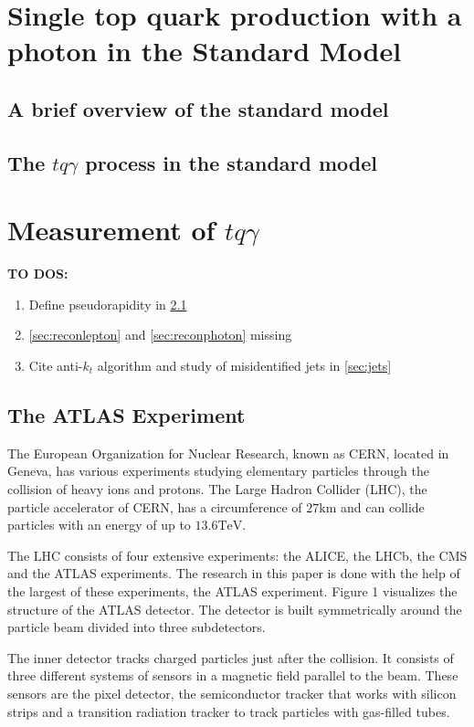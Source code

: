 \chapter{Single top quark production with a photon in the Standard Model}
\section{A brief overview of the standard model}
\section{The \texorpdfstring{$tq\gamma$}{tqGamma} process in the standard model}


\chapter{Measurement of \texorpdfstring{$tq\gamma$}{tqGamma}}
\textbf{TO DOS:}
\begin{enumerate}
    \item Define pseudorapidity in \ref{sec:atlas}
    \item \ref{sec:reconlepton} and \ref{sec:reconphoton} missing
    \item Cite anti-$k_t$ algorithm and study of misidentified jets in \ref{sec:jets}
\end{enumerate}


\section{The ATLAS Experiment}
\label{sec:atlas}
The European Organization for Nuclear Research, known as CERN, located in Geneva, has various experiments studying elementary particles through the collision of heavy ions and protons. 
The Large Hadron Collider (LHC), the particle accelerator of CERN, has a circumference of $27 \si{\kilo\metre}$ and can collide particles with an energy of up to $13.6 \si{\tera\electronvolt}$. 


The LHC consists of four extensive experiments: the ALICE, the LHCb, the CMS and the ATLAS experiments. The research in this paper is done with the help of the largest of these experiments, the ATLAS experiment. Figure 1 visualizes the structure of the ATLAS detector.  The detector is built symmetrically around the particle beam divided into three subdetectors.

The inner detector tracks charged particles just after the collision. It consists of three different systems of sensors in a magnetic field parallel to the beam. These sensors are the pixel detector, the semiconductor tracker that works with silicon strips and a transition radiation tracker to track particles with gas-filled tubes. 


